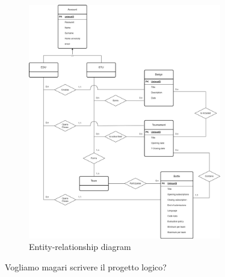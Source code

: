 \begin{figure}[H]
    \centering
    \includegraphics[width=0.75\textwidth]{images/diagrams/er_diagram.png}
    \caption{Entity-relationship diagram}
    \label{fig:er_diagram}
\end{figure}

{\color{red} Vogliamo magari scrivere il progetto logico? \\}

